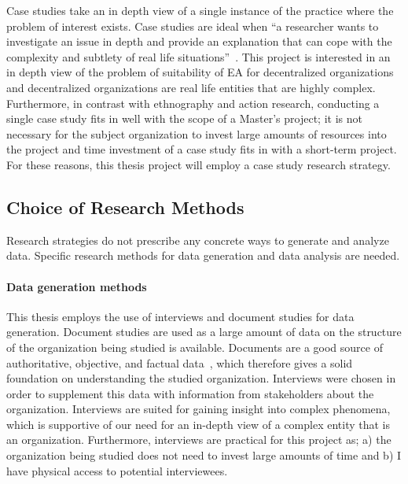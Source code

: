 Case studies take an in depth view of a single instance of the practice where the problem of interest exists. Case studies are ideal when ``a researcher wants to investigate an issue in depth and provide an explanation that can cope with the complexity and subtlety of real life situations''~\cite{denscombe2010good}. This project is interested in an in depth view of the problem of suitability of EA for decentralized organizations and decentralized organizations are real life entities that are highly complex. Furthermore, in contrast with ethnography and action research, conducting a single case study fits in well with the scope of a Master's project; it is not necessary for the subject organization to invest large amounts of resources into the project and time investment of a case study fits in with a short-term project. For these reasons, this thesis project will employ a case study research strategy.  

\subsection{Choice of Research Methods}

Research strategies do not prescribe any concrete ways to generate and analyze data. Specific research methods for data generation and data analysis are needed. 


\paragraph*{Data generation methods}


This thesis employs the use of interviews and document studies for data generation.  Document studies are used as a large amount of data on the structure of the organization being studied is available. Documents are a good source of authoritative, objective, and factual data~\cite{denscombe2010good}, which therefore gives a solid foundation on understanding the studied organization. Interviews were chosen in order to supplement this data with information from stakeholders about the organization. Interviews are suited for gaining insight into complex phenomena, which is supportive of our need for an in-depth view of a complex entity that is an organization. Furthermore, interviews are practical for this project as; a) the organization being studied does not need to invest large amounts of time and b) I have physical access to potential interviewees. 

